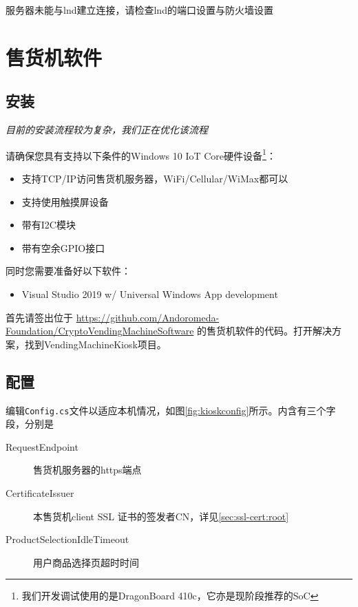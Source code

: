 \documentclass[a4paper,11pt]{article}
\theoremstyle{definition}
\begin{document}
服务器未能与lnd建立连接，请检查lnd的端口设置与防火墙设置

\section{售货机软件}

\subsection{安装}

\textit{目前的安装流程较为复杂，我们正在优化该流程}

请确保您具有支持以下条件的Windows 10 IoT Core硬件设备\footnote{我们开发调试使用的是DragonBoard 410c，它亦是现阶段推荐的SoC}：
\begin{itemize}
  \item 支持TCP/IP访问售货机服务器，WiFi/Cellular/WiMax都可以
  \item 支持使用触摸屏设备
  \item 带有I2C模块
  \item 带有空余GPIO接口
\end{itemize}

同时您需要准备好以下软件：
\begin{itemize}
  \item Visual Studio 2019 w/ Universal Windows App development
\end{itemize}

首先请签出位于 
\url{https://github.com/Andoromeda-Foundation/CryptoVendingMachineSoftware} 的售货机软件的代码。打开解决方案，找到VendingMachineKiosk项目。

\subsection{配置}\label{sec:vm-soft-config}

编辑\verb|Config.cs|文件以适应本机情况，如图\ref{fig:kioskconfig}所示。内含有三个字段，分别是
\begin{description}
  \item[RequestEndpoint] 售货机服务器的https端点
  \item[CertificateIssuer] 本售货机client SSL 证书的签发者CN，详见\ref{sec:ssl-cert:root}
  \item[ProductSelectionIdleTimeout] 用户商品选择页超时时间
\end{description}
\end{document}
